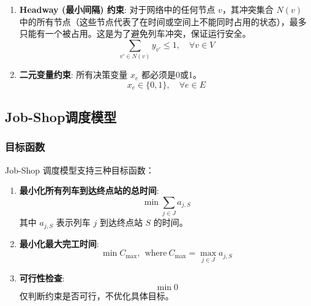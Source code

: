 \documentclass{article}
\begin{document}
\begin{enumerate}
        \item \textbf{Headway (最小间隔) 约束}:
        对于网络中的任何节点 $v$，其冲突集合 $N(v)$
        中的所有节点（这些节点代表了在时间或空间上不能同时占用的状态），最多只能有一个被占用。这是为了避免列车冲突，保证运行安全。
        \begin{equation}
            \sum_{v' \in N(v)} y_{v'} \le 1, \quad \forall v \in
            V\label{eq:con_headway}
        \end{equation}

        \item \textbf{二元变量约束}:
        所有决策变量 $x_e$ 都必须是0或1。
        \begin{equation}
            x_e \in \{0,1\}, \quad \forall e \in E\label{eq:con_binary}
        \end{equation}
    \end{enumerate}

    \subsection{Job-Shop调度模型}\label{subsec:job-shop}

    \subsubsection{目标函数}
    Job-Shop 调度模型支持三种目标函数：

    \begin{enumerate}
        \item \textbf{最小化所有列车到达终点站的总时间}:
        \begin{equation}
            \min \sum_{j \in J} a_{j, S}\label{eq:min_sum_arrival}
        \end{equation}
        其中 $a_{j, S}$ 表示列车 $j$ 到达终点站 $S$ 的时间。

        \item \textbf{最小化最大完工时间}:
        \begin{equation}
            \min C_{\max} , \ \ \text{where} \ C_{\max} = \max_{j \in J}
            a_{j, S}\label{eq:min}
        \end{equation}

        \item \textbf{可行性检查}:
        \begin{equation}
            \min 0\label{eq:feasibility}
        \end{equation}
        仅判断约束是否可行，不优化具体目标。
    \end{enumerate}
\end{document}
